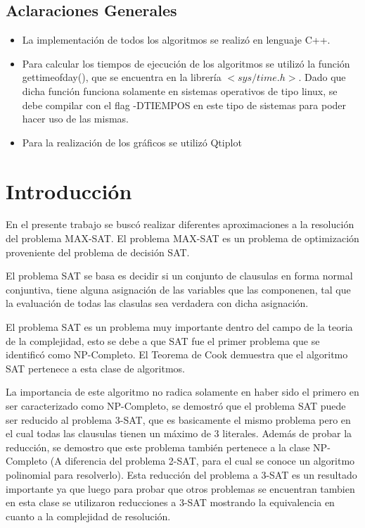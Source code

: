 \documentclass[a4paper,10pt]{article}
\begin{document}
\tableofcontents

\newpage


\begin{center}
\section*{Aclaraciones Generales}

\begin{itemize}
\item La implementación de todos los algoritmos se realizó en lenguaje C++.

\item Para calcular los tiempos de ejecución de los algoritmos se utilizó la función gettimeofday(), que se encuentra en la librería $<sys/time.h>$. Dado que dicha función funciona solamente en sistemas operativos de tipo linux, se debe compilar con el flag -DTIEMPOS en este tipo de sistemas para poder hacer uso de las mismas.

\item Para la realización de los gráficos se utilizó Qtiplot
\end{itemize}

\end{center}

\newpage

\section*{Introducci\'on}

En el presente trabajo se busc\'o realizar diferentes aproximaciones a la resoluci\'on del problema MAX-SAT. El problema MAX-SAT es un problema de optimizaci\'on proveniente del problema de decisi\'on SAT. 

El problema SAT se basa es decidir si un conjunto de clausulas en forma normal conjuntiva, tiene alguna asignaci\'on de las variables que las componenen, tal que la evaluaci\'on de todas las clasulas sea verdadera con dicha asignaci\'on.

El problema SAT es un problema muy importante dentro del campo de la teoria de la complejidad, esto se debe a que SAT fue el primer problema que se identific\'o como NP-Completo. El Teorema de Cook demuestra que el algoritmo SAT pertenece a esta clase de algoritmos.

La importancia de este algoritmo no radica solamente en haber sido el primero en ser caracterizado como NP-Completo, se demostr\'o que el problema SAT puede ser reducido al problema 3-SAT, que es basicamente el mismo problema pero en el cual todas las clausulas tienen un m\'aximo de 3 literales. Adem\'as de probar la reducci\'on, se demostro que este problema tambi\'en pertenece a la clase NP-Completo (A diferencia del problema 2-SAT, para el cual se conoce un algoritmo polinomial para resolverlo). Esta reducci\'on del problema a 3-SAT es un resultado importante ya que luego para probar que otros problemas se encuentran tambien en esta clase se utilizaron reducciones a 3-SAT mostrando la equivalencia en cuanto a la complejidad de resoluci\'on.
\end{document}
